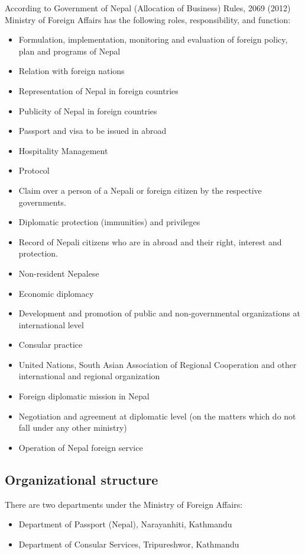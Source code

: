 \documentclass[
  openany]{book}
\providecommand{\tightlist}{%
  \setlength{\itemsep}{0pt}\setlength{\parskip}{0pt}}
\begin{document}
According to Government of Nepal (Allocation of Business) Rules, 2069 (2012) Ministry of Foreign Affairs has the following roles, responsibility, and function:

\begin{itemize}
\tightlist
\item
  Formulation, implementation, monitoring and evaluation of foreign policy, plan and programs of Nepal
\item
  Relation with foreign nations
\item
  Representation of Nepal in foreign countries
\item
  Publicity of Nepal in foreign countries
\item
  Passport and visa to be issued in abroad
\item
  Hospitality Management
\item
  Protocol
\item
  Claim over a person of a Nepali or foreign citizen by the respective governments.
\item
  Diplomatic protection (immunities) and privileges
\item
  Record of Nepali citizens who are in abroad and their right, interest and protection.
\item
  Non-resident Nepalese
\item
  Economic diplomacy
\item
  Development and promotion of public and non-governmental organizations at international level
\item
  Consular practice
\item
  United Nations, South Asian Association of Regional Cooperation and other international and regional organization
\item
  Foreign diplomatic mission in Nepal
\item
  Negotiation and agreement at diplomatic level (on the matters which do not fall under any other ministry)
\item
  Operation of Nepal foreign service
\end{itemize}

\hypertarget{organizational-structure}{%
\subsection{Organizational structure}\label{organizational-structure}}

There are two departments under the Ministry of Foreign Affairs:

\begin{itemize}
\tightlist
\item
  Department of Passport (Nepal), Narayanhiti, Kathmandu
\item
  Department of Consular Services, Tripureshwor, Kathmandu
\end{itemize}
\end{document}
